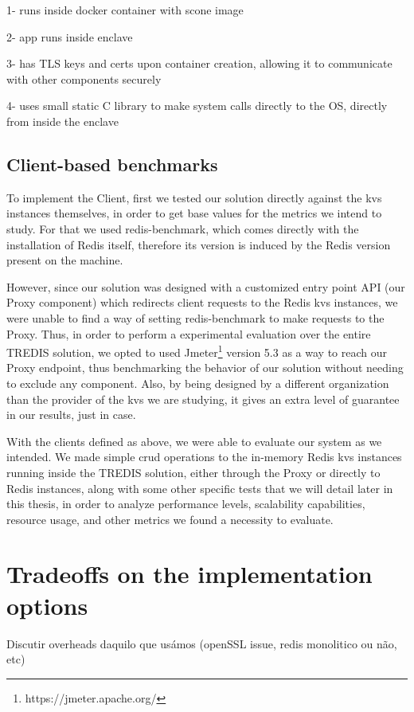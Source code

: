 1- runs inside docker container with scone image

2- app runs inside enclave

3- has TLS keys and certs upon container creation, allowing it to communicate with other components securely

4- uses small static C library to make system calls directly to the OS, directly from inside the enclave



\subsection{Client-based benchmarks}

To implement the Client, first we tested our solution directly against the \gls{kvs} instances themselves, in order to get base values for the metrics we intend to study. For that we used redis-benchmark, which comes directly with the installation of Redis itself, therefore its version is induced by the Redis version present on the machine.

However, since our solution was designed with a customized entry point API (our Proxy component) which redirects client requests to the Redis \gls{kvs} instances, we were unable to find a way of setting redis-benchmark to make requests to the Proxy. 
Thus, in order to perform a experimental evaluation over the entire TREDIS solution, we opted to used Jmeter\footnote{https://jmeter.apache.org/} version 5.3 as a way to reach our Proxy endpoint, thus benchmarking the behavior of our solution without needing to exclude any component. Also, by being designed by a different organization than the provider of the \gls{kvs} we are studying, it gives an extra level of guarantee in our results, just in case.

With the clients defined as above, we were able to evaluate our system as we intended. 
We made simple \gls{crud} operations to the in-memory Redis \gls{kvs} instances running inside the TREDIS solution, either through the Proxy or directly to Redis instances, along with some other specific tests that we will detail later in this thesis, in order to analyze performance levels, scalability capabilities, resource usage, and other metrics we found a necessity to evaluate.


\section{Tradeoffs on the implementation options}
Discutir overheads daquilo que usámos (openSSL issue, redis monolitico ou não, etc)

